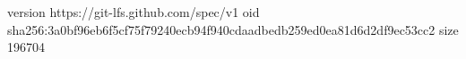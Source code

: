 version https://git-lfs.github.com/spec/v1
oid sha256:3a0bf96eb6f5cf75f79240ecb94f940cdaadbedb259ed0ea81d6d2df9ec53cc2
size 196704
